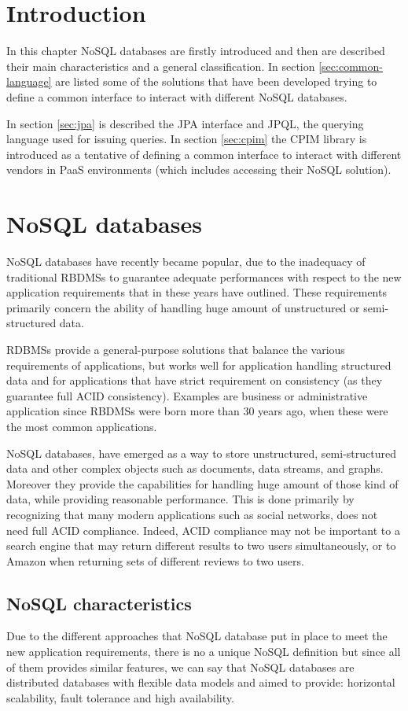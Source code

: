 \section{Introduction}
In this chapter NoSQL databases are firstly introduced and then are described their main characteristics and a general classification. In section \ref{sec:common-language} are listed some of the solutions that have been developed trying to define a common interface to interact with different NoSQL databases.

\noindent In section \ref{sec:jpa} is described the JPA interface and JPQL, the querying language used for issuing queries. In section \ref{sec:cpim} the CPIM library is introduced as a tentative of defining a common interface to interact with different vendors in PaaS environments (which includes accessing their NoSQL solution).

\section{NoSQL databases}
\label{sec:nosql}
NoSQL databases have recently became popular, due to the inadequacy of traditional RBDMSs to guarantee adequate performances with respect to the new application requirements that in these years have outlined. These requirements primarily concern the ability of handling huge amount of unstructured or semi-structured data.

\noindent RDBMSs provide a general-purpose solutions that balance the various requirements of applications, but works well for application handling structured data and for applications that have strict requirement on consistency (as they guarantee full ACID consistency). Examples are business or administrative application since RBDMSs were born more than 30 years ago, when these were the most common applications.

\noindent NoSQL databases, have emerged as a way to store unstructured, semi-structured data and other complex objects such as documents, data streams, and graphs. Moreover they provide the capabilities for handling huge amount of those kind of data, while providing reasonable performance.
This is done primarily by recognizing that many modern applications such as social networks, does not need full ACID compliance. Indeed, ACID compliance may not be important to a search engine that may return different results to two users simultaneously, or to Amazon when returning sets of different reviews to two users.

\subsection{NoSQL characteristics}
Due to the different approaches that NoSQL database put in place to meet the new application requirements, there is no a unique NoSQL definition but since all of them provides similar features, we can say that NoSQL databases are distributed databases with flexible data models and aimed to provide: horizontal scalability, fault tolerance and high availability.

